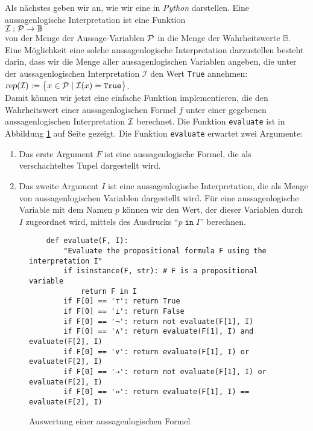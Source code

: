 Als nächstes geben wir an, wie wir eine  in \textsl{Python}
darstellen.  Eine aussagenlogische Interpretation ist eine Funktion 
\\[0.2cm]
\hspace*{1.3cm} ${\cal I}: {\cal P} \rightarrow \mathbb{B}$ \\[0.2cm]
von der Menge der Aussage-Variablen ${\cal P}$ in die Menge der Wahrheitswerte 
$\mathbb{B}$.  Eine Möglichkeit eine solche aussagenlogische Interpretation darzustellen besteht
darin,  dass wir die Menge aller aussagenlogischen Variablen angeben, die unter der aussagenlogischen
Interpretation $\mathcal{I}$ den Wert \texttt{True} annehmen:
\\[0.2cm]
\hspace*{1.3cm}
$\textsl{rep}(\mathcal{I}) := \bigl\{ x \in \mathcal{P} \mid \mathcal{I}(x) = \texttt{True} \bigr\}$.
\\[0.2cm]
Damit können wir jetzt eine einfache Funktion implementieren, die den Wahrheitswert
einer aussagenlogischen Formel $f$ unter einer gegebenen aussagenlogischen
Interpretation ${\cal I}$ berechnet. Die Funktion
\texttt{evaluate}
ist in Abbildung \ref{fig:evaluate.py} auf Seite \pageref{fig:evaluate.py} gezeigt.
Die Funktion \texttt{evaluate} erwartet zwei Argumente:
\begin{enumerate}
\item Das erste Argument $F$ ist eine aussagenlogische Formel, die als verschachteltes Tupel dargestellt
      wird.
\item Das zweite Argument $I$ ist eine aussagenlogische Interpretation, die als Menge von aussagenlogischen Variablen
      dargestellt wird.  Für eine aussagenlogische Variable mit dem Namen $p$ können wir den Wert,
      der dieser Variablen durch $I$ zugeordnet wird, mittels des Ausdrucks ``$p \;\mathtt{in}\; I$'' berechnen.
\end{enumerate}

\begin{figure}[!ht]
  \centering
\begin{verbatim}
    def evaluate(F, I):
        "Evaluate the propositional formula F using the interpretation I"
        if isinstance(F, str): # F is a propositional variable
            return F in I
        if F[0] == '⊤': return True
        if F[0] == '⊥': return False
        if F[0] == '¬': return not evaluate(F[1], I)
        if F[0] == '∧': return evaluate(F[1], I) and evaluate(F[2], I)
        if F[0] == '∨': return evaluate(F[1], I) or evaluate(F[2], I)
        if F[0] == '→': return not evaluate(F[1], I) or evaluate(F[2], I)
        if F[0] == '↔': return evaluate(F[1], I) == evaluate(F[2], I)
\end{verbatim}
\vspace*{-0.3cm}
  \caption{Auswertung einer aussagenlogischen Formel}
  \label{fig:evaluate.py}
\end{figure} 

